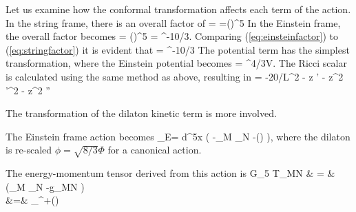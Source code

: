 Let us examine how the conformal transformation affects each term of the action.
In the string frame, there is an overall factor of 
\be
\root  = =\left(\right)^5
\label{eq:stringfactor}
\ee
In the Einstein frame, the overall factor becomes
\be
{} = \left(\right)^5 =  \EXP^{-10\Phi/3}.
\label{eq:einsteinfactor}
\ee
Comparing (\ref{eq:einsteinfactor}) to (\ref{eq:stringfactor}) it is evident that 
\be
{} = \EXP^{-10\Phi/3}\root
\ee
The potential term has the simplest transformation, where the Einstein potential becomes 
\be
{} = \EXP^{4\Phi/3}V.
\label{eq:Vtrans}
\ee
The Ricci scalar is calculated using the same method as above, resulting in
\be
{} = -20/L^2 - z \phi'  - z^2 \phi'^2 - z^2 \phi''
\ee

The transformation of the dilaton kinetic term is more involved. %

The Einstein frame action becomes 
\be
{}_E= \int d^5x  \left( -\thalf\partial_M \phi \partial_N \phi -(\phi)  \right),
\label{eq:dilatonActionEinstein}
\ee
where the dilaton is re-scaled $\phi=\sqrt{8/3}\Phi$ for a canonical action.

The energy-momentum tensor derived from this action is
\pi G_5 T_{MN} & = & \thalf(\partial_M \phi \partial_N \phi -g_{MN} ) \label{eq:EMtensor1}\\
 &=& \thalf \partial_\lambda \phi \partial^\lambda \phi +(\phi) 
\label{eq:EMtensor2}
\ea


